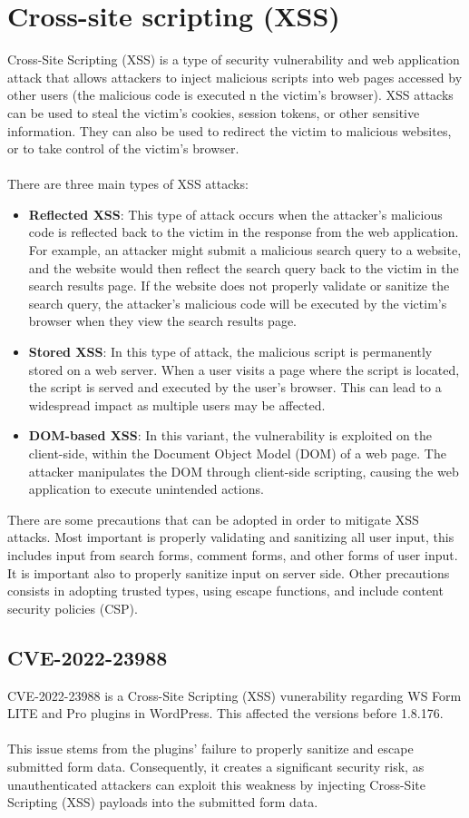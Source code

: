 \documentclass{article}
\begin{document}
	\section{Cross-site scripting (XSS)}
	  Cross-Site Scripting (XSS) is a type of security vulnerability and web application attack that allows attackers to inject malicious scripts into web pages accessed by other users (the malicious code is executed n the victim's browser). XSS attacks can be used to steal the victim's cookies, session tokens, or other sensitive information. They can also be used to redirect the victim to malicious websites, or to take control of the victim's browser. \\ \\
	  There are three main types of XSS attacks:
	\begin{itemize}
		\item \textbf{Reflected XSS}: This type of attack occurs when the attacker's malicious code is reflected back to the victim in the response from the web application. For example, an attacker might submit a malicious search query to a website, and the website would then reflect the search query back to the victim in the search results page. If the website does not properly validate or sanitize the search query, the attacker's malicious code will be executed by the victim's browser when they view the search results page.
	  	\item \textbf{Stored XSS}: In this type of attack, the malicious script is permanently stored on a web server. When a user visits a page where the script is located, the script is served and executed by the user's browser. This can lead to a widespread impact as multiple users may be affected.
	  	\item \textbf{DOM-based XSS}: In this variant, the vulnerability is exploited on the client-side, within the Document Object Model (DOM) of a web page. The attacker manipulates the DOM through client-side scripting, causing the web application to execute unintended actions.
	  \end{itemize}
	  There are some precautions that can be adopted in order to mitigate XSS attacks. Most important is properly validating and sanitizing all user input, this includes input from search forms, comment forms, and other forms of user input. It is important also to properly sanitize input on server side. Other precautions consists in adopting trusted types, using escape functions, and include content security policies (CSP).
	
	\subsection{CVE-2022-23988}
	CVE-2022-23988 is a Cross-Site Scripting (XSS) vunerability regarding WS Form LITE and Pro plugins in WordPress. This affected the versions before 1.8.176. \\ \\
	This issue stems from the plugins' failure to properly sanitize and escape submitted form data. Consequently, it creates a significant security risk, as unauthenticated attackers can exploit this weakness by injecting Cross-Site Scripting (XSS) payloads into the submitted form data.
	
\end{document}
